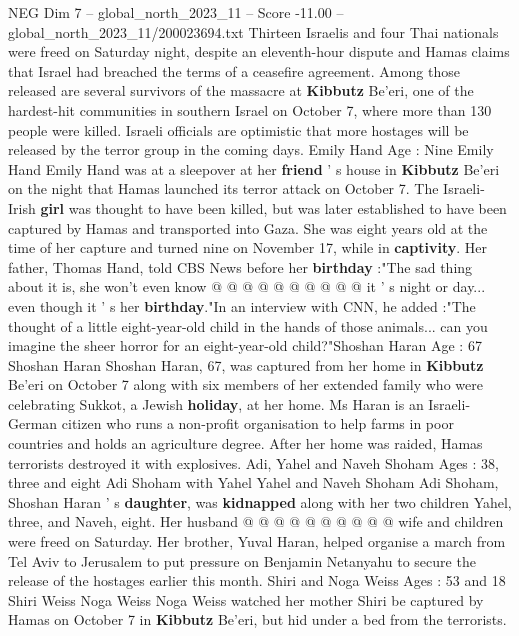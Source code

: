 \begin{textsample}{NEG Dim 7 – global\_north\_2023\_11 – Score -11.00 – global\_north\_2023\_11/200023694.txt}  \label{ex:f7_neg_042}
Thirteen Israelis and four Thai nationals were freed on Saturday night, despite an eleventh-hour dispute and Hamas claims that Israel had breached the terms of a ceasefire agreement.
Among those released are several survivors of the massacre at \textbf{Kibbutz} Be'eri, one of the hardest-hit communities in southern Israel on October 7, where more than 130 people were killed.
Israeli officials are optimistic that more hostages will be released by the terror group in the coming days.
Emily Hand Age : Nine Emily Hand Emily Hand was at a sleepover at her \textbf{friend} ' s house in \textbf{Kibbutz} Be'eri on the night that Hamas launched its terror attack on October 7.
The Israeli-Irish \textbf{girl} was thought to have been killed, but was later established to have been captured by Hamas and transported into Gaza.
She was eight years old at the time of her capture and turned nine on November 17, while in \textbf{captivity}.
Her father, Thomas Hand, told CBS News before her \textbf{birthday} :"The sad thing about it is, she won't even know @ @ @ @ @ @ @ @ @ @ it ' s night or day... even though it ' s her \textbf{birthday}."In an interview with CNN, he added :"The thought of a little eight-year-old child in the hands of those animals... can you imagine the sheer horror for an eight-year-old child?"Shoshan Haran Age : 67 Shoshan Haran Shoshan Haran, 67, was captured from her home in \textbf{Kibbutz} Be'eri on October 7 along with six members of her extended family who were celebrating Sukkot, a Jewish \textbf{holiday}, at her home.
Ms Haran is an Israeli-German citizen who runs a non-profit organisation to help farms in poor countries and holds an agriculture degree.
After her home was raided, Hamas terrorists destroyed it with explosives.
Adi, Yahel and Naveh Shoham Ages : 38, three and eight Adi Shoham with Yahel Yahel and Naveh Shoham Adi Shoham, Shoshan Haran ' s \textbf{daughter}, was \textbf{kidnapped} along with her two children Yahel, three, and Naveh, eight.
Her husband @ @ @ @ @ @ @ @ @ @ wife and children were freed on Saturday.
Her brother, Yuval Haran, helped organise a march from Tel Aviv to Jerusalem to put pressure on Benjamin Netanyahu to secure the release of the hostages earlier this month.
Shiri and Noga Weiss Ages : 53 and 18 Shiri Weiss Noga Weiss Noga Weiss watched her mother Shiri be captured by Hamas on October 7 in \textbf{Kibbutz} Be'eri, but hid under a bed from the terrorists.

\end{textsample}
